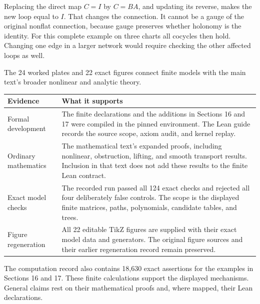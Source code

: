 Replacing the direct map $C=I$ by $C=BA$, and updating its reverse, makes the new loop equal to $I$. That changes the connection. It cannot be a gauge of the original nonflat connection, because gauge preserves whether holonomy is the identity. For this complete example on three charts all cocycles then hold. Changing one edge in a larger network would require checking the other affected loops as well.


The 24 worked plates and 22 exact figures connect finite models with the main text's broader nonlinear and analytic theory.

{\small
\begin{tabularx}{\linewidth}{@{}p{.24\linewidth}Y@{}}\toprule
\textbf{Evidence} & \textbf{What it supports}\\\midrule
Formal development & The finite declarations and the additions in Sections 16 and 17 were compiled in the pinned environment. The Lean guide records the source scope, axiom audit, and kernel replay.\\
Ordinary mathematics & The mathematical text's expanded proofs, including nonlinear, obstruction, lifting, and smooth transport results. Inclusion in that text does not add these results to the finite Lean contract.\\
Exact model checks & The recorded run passed all 124 exact checks and rejected all four deliberately false controls. The scope is the displayed finite matrices, paths, polynomials, candidate tables, and trees.\\
Figure regeneration & All 22 editable TikZ figures are supplied with their exact model data and generators. The original figure sources and their earlier regeneration record remain preserved.\\\bottomrule
\end{tabularx}}

The computation record also contains 18,630 exact assertions for the examples in Sections 16 and 17. These finite calculations support the displayed mechanisms. General claims rest on their mathematical proofs and, where mapped, their Lean declarations.


